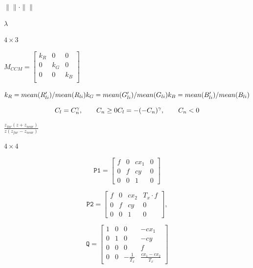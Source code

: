 \documentclass{article}
\begin{document}
$\|\|\cdot\|\|$
\pagebreak

$\lambda$
\pagebreak

$4\times3$
\pagebreak

$                               M_{CCM}=
                               \begin{bmatrix}
                               k_R & 0 & 0\\
                               0 & k_G & 0\\
                               0 & 0 & k_B\\
                               \end{bmatrix}
$
\pagebreak

$                               k_R=mean(R_{li}')/mean(R_{li})\\
                               k_G=mean(G_{li}')/mean(G_{li})\\
                               k_B=mean(B_{li}')/mean(B_{li})
$
\pagebreak

\[        C_l=C_n^{\gamma},\qquad C_n\ge0\\
        C_l=-(-C_n)^{\gamma},\qquad C_n<0\\\\
\]
\pagebreak

$ \frac{z_{far} \left(z + z_{near}\right)}{z \left(z_{far} - z_{near}\right)} $
\pagebreak

$4 \times 4$
\pagebreak

\[\texttt{P1} = \begin{bmatrix}
                        f & 0 & cx_1 & 0 \\
                        0 & f & cy & 0 \\
                        0 & 0 & 1 & 0
                     \end{bmatrix}\]
\pagebreak

\[\texttt{P2} = \begin{bmatrix}
                        f & 0 & cx_2 & T_x \cdot f \\
                        0 & f & cy & 0 \\
                        0 & 0 & 1 & 0
                     \end{bmatrix} ,\]
\pagebreak

\[\texttt{Q} = \begin{bmatrix}
                        1 & 0 & 0 & -cx_1 \\
                        0 & 1 & 0 & -cy \\
                        0 & 0 & 0 & f \\
                        0 & 0 & -\frac{1}{T_x} & \frac{cx_1 - cx_2}{T_x}
                    \end{bmatrix} \]
\pagebreak
\end{document}

